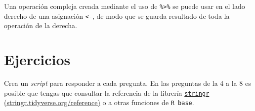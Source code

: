 \documentclass[
]{book}
\newenvironment{Shaded}{\begin{snugshade}}{\end{snugshade}}
\newcommand{\DataTypeTok}[1]{\textcolor[rgb]{0.13,0.29,0.53}{#1}}
\newcommand{\DecValTok}[1]{\textcolor[rgb]{0.00,0.00,0.81}{#1}}
\newcommand{\KeywordTok}[1]{\textcolor[rgb]{0.13,0.29,0.53}{\textbf{#1}}}
\newcommand{\NormalTok}[1]{#1}
\newcommand{\OperatorTok}[1]{\textcolor[rgb]{0.81,0.36,0.00}{\textbf{#1}}}
\newcommand{\StringTok}[1]{\textcolor[rgb]{0.31,0.60,0.02}{#1}}
\begin{document}
Una operación compleja creada mediante el uso de \texttt{\%\textgreater{}\%} se puede usar en el lado derecho de una asignación \texttt{\textless{}-}, de modo que se guarda resultado de toda la operación de la derecha.

\begin{Shaded}
\end{Shaded}

\hypertarget{ejercicios}{%
\section{Ejercicios}\label{ejercicios}}

Crea un \emph{script} para responder a cada pregunta. En las preguntas de la 4 a la 8 es posible que tengas que consultar la referencia de la librería \href{https://stringr.tidyverse.org/reference/index.html}{\texttt{stringr} (stringr.tidyverse.org/reference)} o a otras funciones de \texttt{R\ base}.
\end{document}
